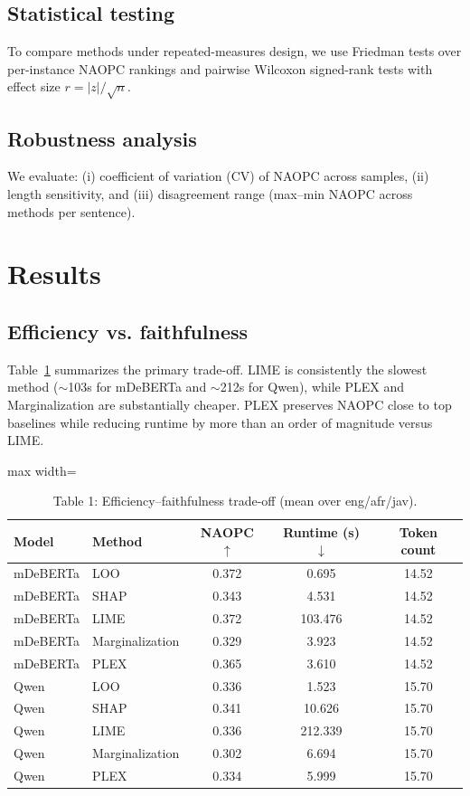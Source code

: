 \documentclass[11pt]{article}
\begin{document}
\subsection{Statistical testing}
To compare methods under repeated-measures design, we use Friedman tests over per-instance NAOPC rankings and pairwise Wilcoxon signed-rank tests with effect size $r=|z|/\sqrt{n}$.

\subsection{Robustness analysis}
We evaluate: (i) coefficient of variation (CV) of NAOPC across samples, (ii) length sensitivity, and (iii) disagreement range (max--min NAOPC across methods per sentence).

\section{Results}
\subsection{Efficiency vs. faithfulness}
Table~\ref{tab:tradeoff} summarizes the primary trade-off. LIME is consistently the slowest method (\(\sim\)103s for mDeBERTa and \(\sim\)212s for Qwen), while PLEX and Marginalization are substantially cheaper. PLEX preserves NAOPC close to top baselines while reducing runtime by more than an order of magnitude versus LIME.

\begin{table}[H]
\centering
\caption{Table 1: Efficiency--faithfulness trade-off (mean over eng/afr/jav).}
\label{tab:tradeoff}
\begin{adjustbox}{max width=\textwidth}
\begin{tabular}{llccc}
\toprule
Model & Method & NAOPC $\uparrow$ & Runtime (s) $\downarrow$ & Token count \\
\midrule
mDeBERTa & LOO & 0.372 & 0.695 & 14.52 \\
mDeBERTa & SHAP & 0.343 & 4.531 & 14.52 \\
mDeBERTa & LIME & 0.372 & 103.476 & 14.52 \\
mDeBERTa & Marginalization & 0.329 & 3.923 & 14.52 \\
mDeBERTa & PLEX & 0.365 & 3.610 & 14.52 \\
\midrule
Qwen & LOO & 0.336 & 1.523 & 15.70 \\
Qwen & SHAP & 0.341 & 10.626 & 15.70 \\
Qwen & LIME & 0.336 & 212.339 & 15.70 \\
Qwen & Marginalization & 0.302 & 6.694 & 15.70 \\
Qwen & PLEX & 0.334 & 5.999 & 15.70 \\
\bottomrule
\end{tabular}
\end{adjustbox}
\end{table}
\end{document}
